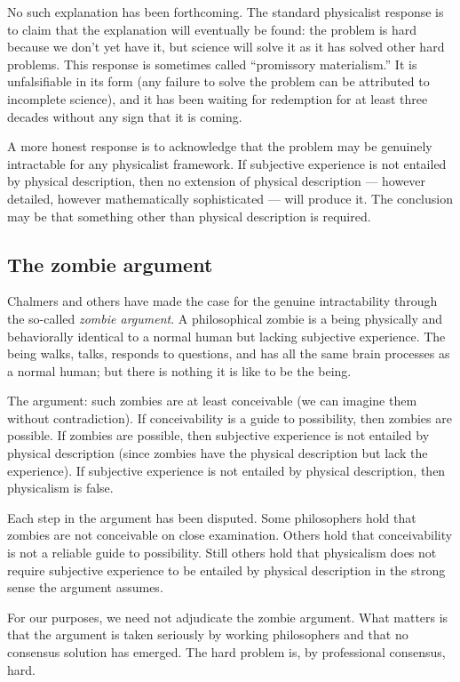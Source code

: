 No such explanation has been forthcoming. The standard physicalist
response is to claim that the explanation will eventually be found:
the problem is hard because we don't yet have it, but science will
solve it as it has solved other hard problems. This response is
sometimes called ``promissory materialism.'' It is unfalsifiable in
its form (any failure to solve the problem can be attributed to
incomplete science), and it has been waiting for redemption for at
least three decades without any sign that it is coming.

A more honest response is to acknowledge that the problem may be
genuinely intractable for any physicalist framework. If subjective
experience is not entailed by physical description, then no
extension of physical description --- however detailed, however
mathematically sophisticated --- will produce it. The conclusion may
be that something other than physical description is required.

\subsection{The zombie argument}

Chalmers and others have made the case for the genuine intractability
through the so-called \emph{zombie argument}. A philosophical
zombie is a being physically and behaviorally identical to a normal
human but lacking subjective experience. The being walks, talks,
responds to questions, and has all the same brain processes as a
normal human; but there is nothing it is like to be the being.

The argument: such zombies are at least conceivable (we can imagine
them without contradiction). If conceivability is a guide to
possibility, then zombies are possible. If zombies are possible,
then subjective experience is not entailed by physical description
(since zombies have the physical description but lack the
experience). If subjective experience is not entailed by physical
description, then physicalism is false.

Each step in the argument has been disputed. Some philosophers hold
that zombies are not conceivable on close examination. Others hold
that conceivability is not a reliable guide to possibility. Still
others hold that physicalism does not require subjective experience
to be entailed by physical description in the strong sense the
argument assumes.

For our purposes, we need not adjudicate the zombie argument. What
matters is that the argument is taken seriously by working
philosophers and that no consensus solution has emerged. The hard
problem is, by professional consensus, hard.

